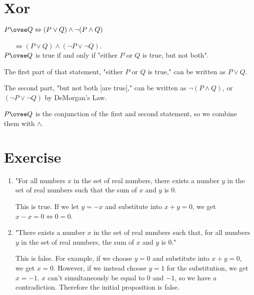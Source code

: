 \documentclass{article}
\begin{document}
\section{Xor}

$P \ovee Q \Leftrightarrow (P \lor Q) \land \lnot(P \land Q)$ 

$\quad \ \ \Leftrightarrow (P \lor Q) \land  (\lnot P \lor \lnot Q)$.\\


$P \ovee Q$ is true if and only if "either $P$ or $Q$ is true, but not both". 

The first part of that statement, "either $P$ or $Q$ is true," can be written as $P \lor Q$. 

The second part, "but not both [are true]," can be written as $\lnot (P \land Q)$, or $(\lnot P \lor \lnot Q)$ by DeMorgan's Law.

$P \ovee Q$ is the conjunction of the first and second statement, so we combine them with $\land$.


\section{Exercise}

\begin{enumerate}[label=\alph*)]
    \item 
    "For all numbers $x$ in the set of real numbers, there exists a number $y$ in the set of real numbers such that the sum of $x$ and $y$ is $0$.
    
    This is true. If we let $y = -x$ and substitute into $x+y=0$, we get $x-x=0 \Leftrightarrow 0=0$.
    
    \item
    "There exists a number $x$ in the set of real numbers such that, for all numbers $y$ in the set of real numbers, the sum of $x$ and $y$ is $0$."
    
    This is false. For example, if we choose $y=0$ and substitute into $x+y=0$, we get $x=0$. However, if we instead choose $y=1$ for the substitution, we get $x=-1$. $x$ can't simultaneously be equal to $0$ and $-1$, so we have a contradiction. Therefore the initial proposition is false.

\end{enumerate}

\end{document}
